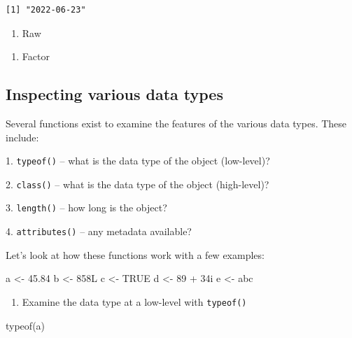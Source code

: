 \documentclass[
  letterpaper,
  DIV=11,
  numbers=noendperiod]{scrreprt}
\newenvironment{Shaded}{\begin{snugshade}}{\end{snugshade}}
\newcommand{\ConstantTok}[1]{\textcolor[rgb]{0.56,0.35,0.01}{#1}}
\newcommand{\DecValTok}[1]{\textcolor[rgb]{0.68,0.00,0.00}{#1}}
\newcommand{\FloatTok}[1]{\textcolor[rgb]{0.68,0.00,0.00}{#1}}
\newcommand{\FunctionTok}[1]{\textcolor[rgb]{0.28,0.35,0.67}{#1}}
\newcommand{\NormalTok}[1]{\textcolor[rgb]{0.00,0.23,0.31}{#1}}
\newcommand{\OtherTok}[1]{\textcolor[rgb]{0.00,0.23,0.31}{#1}}
\newcommand{\SpecialCharTok}[1]{\textcolor[rgb]{0.37,0.37,0.37}{#1}}
\newcommand{\StringTok}[1]{\textcolor[rgb]{0.13,0.47,0.30}{#1}}
\providecommand{\tightlist}{%
  \setlength{\itemsep}{0pt}\setlength{\parskip}{0pt}}\usepackage{longtable,booktabs,array}
\begin{document}
\begin{verbatim}
[1] "2022-06-23"
\end{verbatim}

\begin{enumerate}
\def\labelenumi{\arabic{enumi}.}
\setcounter{enumi}{6}
\tightlist
\item
  Raw
\end{enumerate}

\begin{enumerate}
\def\labelenumi{\arabic{enumi}.}
\setcounter{enumi}{7}
\tightlist
\item
  Factor
\end{enumerate}

\subsection{Inspecting various data
types}\label{inspecting-various-data-types}

Several functions exist to examine the features of the various data
types. These include:

1. \texttt{typeof()} -- what is the data type of the object (low-level)?

2. \texttt{class()} -- what is the data type of the object (high-level)?

3. \texttt{length()} -- how long is the object?

4. \texttt{attributes()} -- any metadata available?

Let's look at how these functions work with a few examples:

\begin{Shaded}
\begin{Highlighting}[]
\NormalTok{a }\OtherTok{\textless{}{-}} \FloatTok{45.84}
\NormalTok{b }\OtherTok{\textless{}{-}} \DecValTok{858}\NormalTok{L}
\NormalTok{c }\OtherTok{\textless{}{-}} \ConstantTok{TRUE}
\NormalTok{d }\OtherTok{\textless{}{-}} \DecValTok{89} \SpecialCharTok{+} \DecValTok{34}\NormalTok{i}
\NormalTok{e }\OtherTok{\textless{}{-}} \StringTok{\textquotesingle{}abc\textquotesingle{}}
\end{Highlighting}
\end{Shaded}

\begin{enumerate}
\def\labelenumi{\arabic{enumi}.}
\tightlist
\item
  Examine the data type at a low-level with \texttt{typeof()}
\end{enumerate}

\begin{Shaded}
\begin{Highlighting}[]
\FunctionTok{typeof}\NormalTok{(a)}
\end{Highlighting}
\end{Shaded}
\end{document}
